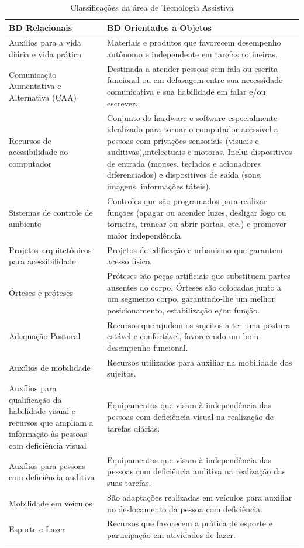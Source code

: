 \documentclass[
	12pt,			%
	openright,		%
	oneside,			%
	a4paper,			%
	chapter=TITLE,		%
	english,			%
	brazil,			%
	]{abntex2}
\begin{document}
\begin{table}[H]
\caption{Classificações da área de Tecnologia Assistiva}
\label{tab:tab-1}
{
\centering
\footnotesize
\begin{tabular}{|p{7cm}|p{7cm}|}
\hline
\textbf{BD Relacionais} & \textbf{BD Orientados a Objetos} \\
\hline
Auxílios para a vida diária e vida prática & Materiais e produtos que favorecem desempenho autônomo e independente em tarefas rotineiras.\\
\hline
Comunicação Aumentativa e Alternativa (CAA) & Destinada a atender pessoas sem fala ou escrita funcional ou em defasagem entre sua necessidade comunicativa e sua habilidade em falar e/ou escrever.\\
\hline
Recursos de acessibilidade ao computador & Conjunto de hardware e software especialmente idealizado para tornar o computador acessível a pessoas com privações sensoriais (visuais e auditivas),intelectuais e motoras. Inclui dispositivos de entrada (mouses, teclados e acionadores diferenciados) e dispositivos de saída (sons, imagens, informações táteis).\\
\hline
Sistemas de controle de ambiente & Controles que são programados para realizar funções (apagar ou acender luzes, desligar fogo ou torneira, trancar ou abrir portas, etc.) e promover maior independência.\\
\hline
Projetos arquitetônicos para acessibilidade & Projetos de edificação e urbanismo que garantem acesso físico.\\
\hline
Órteses e próteses & Próteses são peças artificiais que substituem partes ausentes do corpo. Órteses são colocadas junto a um segmento corpo, garantindo-lhe um melhor posicionamento, estabilização e/ou função.\\
\hline
Adequação Postural & Recursos que ajudem os sujeitos a ter uma postura estável e confortável, favorecendo um bom desempenho funcional.\\
\hline
Auxílios de mobilidade & Recursos utilizados para auxiliar na mobilidade dos sujeitos.\\
\hline
Auxílios para qualificação da habilidade visual e recursos que ampliam a informação às pessoas com deficiência visual & Equipamentos que visam à independência das pessoas com deficiência visual na realização de tarefas diárias.\\
\hline
Auxílios para pessoas com deficiência auditiva & Equipamentos que visam à independência das pessoas com deficiência auditiva na realização das suas tarefas.\\
\hline
Mobilidade em veículos & São adaptações realizadas em veículos para auxiliar no deslocamento da pessoa com deficiência.\\
\hline
Esporte e Lazer & Recursos que favorecem a prática de esporte e participação em atividades de lazer.\\
\hline
\end{tabular}
}
\end{table}
\end{document}
